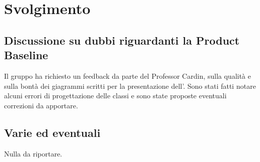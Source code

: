 \newpage
\section*{Svolgimento}

	\subsection*{Discussione su dubbi riguardanti la Product Baseline}
		Il gruppo ha richiesto un feedback da parte del Professor Cardin, sulla qualità e sulla bontà dei giagrammi scritti per la presentazione dell'. Sono stati fatti notare alcuni errori di progettazione delle classi e sono state proposte eventuali correzioni da apportare.

	\subsection*{Varie ed eventuali}
		Nulla da riportare.
